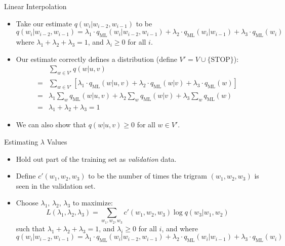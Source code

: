 \documentclass[handout]{beamer}
\begin{document}
\begin{frame}{Linear Interpolation}
    \scriptsize
    \begin{itemize}
     \item Take our estimate $q(w_i | w_{i-2}, w_{i-1})$ to be
    \[
    q(w_i | w_{i-2}, w_{i-1}) = \lambda_1 \cdot q_{\text{ML}}(w_i | w_{i-2}, w_{i-1}) + \lambda_2 \cdot q_{\text{ML}}(w_i | w_{i-1}) + \lambda_3 \cdot q_{\text{ML}}(w_i)
    \]
    where $\lambda_1 + \lambda_2 + \lambda_3 = 1$, and $\lambda_i \geq 0$ for all $i$.
    
    \item Our estimate correctly defines a distribution (define $V' = V \cup \{\text{STOP}\}$):
    \[
    \begin{aligned}
        & \sum_{w \in V'} q(w | u, v) \\
        = & \sum_{w \in V'} [\lambda_1 \cdot q_{\text{ML}}(w | u, v) + \lambda_2 \cdot q_{\text{ML}}(w | v) + \lambda_3 \cdot q_{\text{ML}}(w)] \\
        = & \lambda_1 \sum_{w} q_{\text{ML}}(w | u, v) + \lambda_2 \sum_{w} q_{\text{ML}}(w | v) + \lambda_3 \sum_{w} q_{\text{ML}}(w) \\
        = & \lambda_1 + \lambda_2 + \lambda_3 = 1
    \end{aligned}
    \]
    \item We can also show that $q(w | u, v) \geq 0$ for all $w \in V'$.
    \end{itemize}

    
    
\end{frame}

\begin{frame}{Estimating $\lambda$ Values}
\scriptsize
\begin{itemize}
  \item Hold out part of the training set as \textit{validation} data.
  \item Define $c'(w_1, w_2, w_3)$ to be the number of times the trigram $(w_1, w_2, w_3)$ is seen in the validation set.
  \item Choose $\lambda_1$, $\lambda_2$, $\lambda_3$ to maximize:
  \[
  L(\lambda_1, \lambda_2, \lambda_3) = \sum_{w_1,w_2,w_3} c'(w_1, w_2, w_3) \log q(w_3 | w_1, w_2)
  \]
  such that $\lambda_1 + \lambda_2 + \lambda_3 = 1$, and $\lambda_i \geq 0$ for all $i$, and where
  \[
  q(w_i | w_{i-2}, w_{i-1}) = \lambda_1 \cdot q_{\text{ML}}(w_i | w_{i-2}, w_{i-1}) + \lambda_2 \cdot q_{\text{ML}}(w_i | w_{i-1}) + \lambda_3 \cdot q_{\text{ML}}(w_i)
  \]
\end{itemize}
\end{frame}
\end{document}
